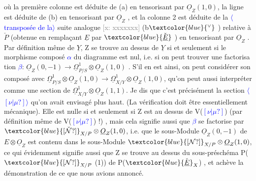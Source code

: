 \documentclass[11pt]{article}
\newcommand{\scanpage}[1]{\par\bigskip\noindent{\small\sffamily[scan #1]}\par}
\newcommand{\mspage}[1]{{\small\sffamily[p.\,#1]}}
\newcommand{\hand}[1]{\textcolor{blue}{#1}}
\newcommand{\inserted}[2][]{\textcolor{blue}{$\langle$#2$\rangle$}}
\newcommand{\xout}[1]{\textcolor{gray}{[\textsf{x:} #1]}}
\newcommand{\unsure}[1]{[#1?]}
\newenvironment{diagramblock}{\par\begin{center}}{\end{center}\par}
\begin{document}
\clearpage
\scanpage{25/40}
\mspage{\hand{36}}

\begin{diagramblock}\end{diagramblock}

où la première colonne est déduite de (a) en tensorisant par $\underline{O}_Z(1,0)$,
la ligne est déduite de  (b) en tensorisant par $\underline{O}_Z$  , et la colonne 2
est déduite  de la \inserted{transposée de la} suite analogue \xout{xxxxxxx} (b$\hand{^\vee}$ ) relative à $\check{P}$  (obtenue
en remplaçant $\underline{E}$ par $\hand{\check{\underline{E}}}$ )  en tensorisant par $\underline{O}_Z$ . Par définition même
de $\underline{Y}$, Z se trouve au dessus de $\underline{Y}$  si et seulement si le morphisme
composé \hand{$\alpha$} du diagramme est nul, i.e.  si on peut trouver une  factorisa
tion \hand{$\beta$}: $\underline{O}_Z(0,-1) \rightarrow \underline{\Omega}^1_{P/S}\otimes \underline{O}_Z(1,0)$ .  S'il en est ainsi, on  peut
considérer  son composé avec  $\underline{\Omega}^1_{P/S} \otimes \underline{O}_Z(1,0) \rightarrow \underline{\Omega}^1_{X/Y} \otimes \underline{O}_Z(1,0)$,
qu'on peut aussi interpréter comme une section de $\underline{\Omega}^1_{X/Y}\otimes \underline{O}_Z(1,1)$.
Je dis que c'est précisément la section \inserted{$\unsure{\nu|\mu}$} qu'on avait envisagé plus haut.
(La vérification doit être essentiellement mécanique).  Elle est
nulle  si et seulement si  Z est au dessus de V(\hand{$\unsure{\nu|\mu}$})  (par définition
même de V(\hand{$\unsure{\nu|\mu}$}) !) , mais cela signifie aussi  que \hand{$\beta$} se factorise par
$\hand{\unsure{\check{\mathcal{N}}}}_{X/P} \otimes \underline{O}_Z(1,0)$, i.e. que  le sous-Module $\underline{O}_Z(0,-1)$ de $E\otimes \underline{O}_Z$ est contenu
dans le sous-Module $\hand{\unsure{\mathcal{N}}}_{X/P} \otimes \underline{O}_Z(1,0)$,  ce qui évidemment signifie aussi
que  Z se trouve au dessus du sous-préschéma  P( $\hand{\unsure{\mathcal{N}}}_{X/P}$ (1)) de P($\hand{\check{\underline{E}}}_X$) , et
achève la démonstration de ce que nous avions annoncé.
\end{document}
